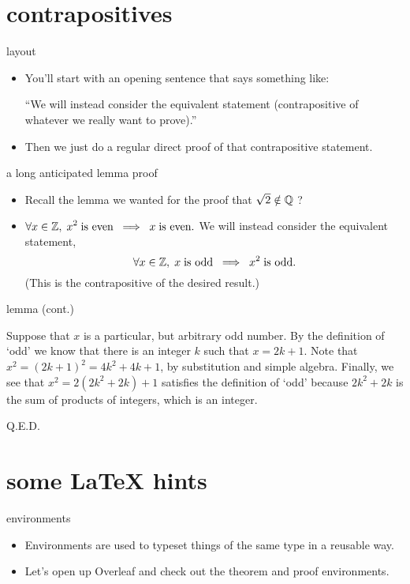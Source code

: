 \documentclass[landscape]{beamer}
\begin{document}
\section{contrapositives}

\begin{frame}{layout}
\begin{itemize}
\item  You'll start with an opening sentence that says something like:\pause \newline

``We will instead consider the equivalent statement (contrapositive of whatever we really want to prove).'' \pause
\item Then we just do a regular direct proof of that contrapositive statement.
\end{itemize}
\end{frame}

\begin{frame}{a long anticipated lemma proof}
\begin{itemize}
\item  Recall the lemma we wanted for the proof that $\sqrt{2} \notin {\mathbb Q}$ ? \pause
\item $ \displaystyle \forall x \in {\mathbb Z}, \; x^2 \; \mbox{is even} \; \implies \; x \;  \mbox{is even.} $ \pause \newline
{} \newline
\noindent We will instead consider the equivalent statement,
\[ \forall x \in {\mathbb Z}, \; x \; \mbox{is odd} \; \implies \; x^2 \;  \mbox{is odd.}  \]
\noindent (This is the contrapositive of the desired result.) \newline
\end{itemize}
\end{frame}

\begin{frame}{lemma (cont.)}

Suppose that $x$ is a particular, but arbitrary odd number.  By the definition of `odd' we know that there is an integer $k$ such that $x = 2k+1$.  Note that $x^2 = (2k+1)^2 = 4k^2+4k+1$, by substitution and simple algebra.  Finally, we see that $x^2 = 2(2k^2+2k) + 1$ satisfies the definition of `odd' because $2k^2 + 2k$ is the sum of products of integers, which is an integer.

\hspace{\fill} Q.E.D.
\end{frame}

\section{some LaTeX hints}

\begin{frame}{environments}
\begin{itemize}
\item Environments are used to typeset things of the same type in a reusable way. \pause
\item Let's open up Overleaf and check out the theorem and proof environments.
\end{itemize}
\end{frame}
\end{document}
